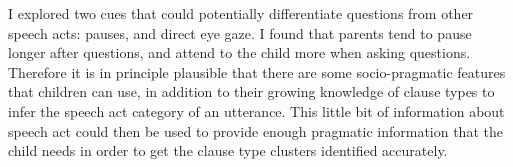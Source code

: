 I explored two cues that could potentially differentiate questions from other speech acts: pauses, and direct eye gaze. I found that parents tend to pause longer after questions, and attend to the child more when asking questions. Therefore it is in principle plausible that there are some socio-pragmatic features that children can use, in addition to their growing knowledge of clause types to infer the speech act category of an utterance. This little bit of information about speech act could then be used to provide enough pragmatic information that the child needs in order to get the clause type clusters identified accurately.

